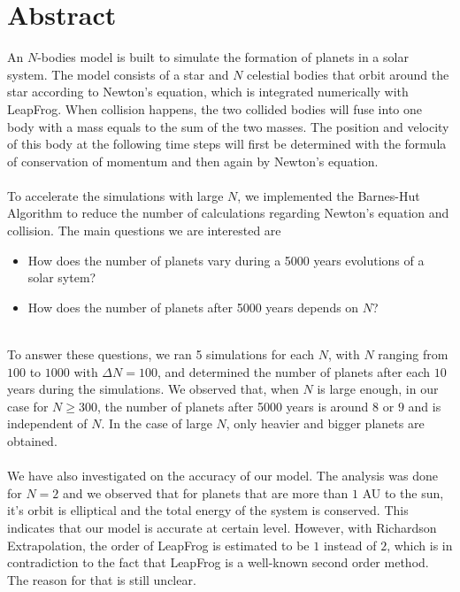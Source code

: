 \section{Abstract}
An $N$-bodies model is built to simulate the formation of planets in a solar system. The model consists of a star and $N$ celestial bodies that orbit around the star according to Newton's equation, which is integrated numerically with LeapFrog. When collision happens, the two collided bodies will fuse into one body with a mass equals to the sum of the two masses. The position and velocity of this body at the following time steps will first be determined with the formula of conservation of momentum and then again by Newton's equation.\\
\\
To accelerate the simulations with large $N$, we implemented the Barnes-Hut Algorithm to reduce the number of calculations regarding Newton's equation and collision. The main questions we are interested are
\begin{itemize}
\item How does the number of planets vary during a 5000 years evolutions of a solar sytem?

\item How does the number of planets after 5000 years depends on $N$?
\end{itemize}
\leavevmode
\\
To answer these questions, we ran 5 simulations for each $N$, with $N$ ranging from $100$ to $1000$ with $\Delta N=100$, and determined the number of planets after each $10$ years during the simulations. We observed that, when $N$ is large enough, in our case for $N\geq 300$, the number of planets after 5000 years is around $8$ or $9$ and is independent of $N$. In the case of large $N$, only heavier and bigger planets are obtained.\\
\\
We have also investigated on the accuracy of our model. The analysis was done for $N=2$ and we observed that for planets that are more than $1$ AU to the sun, it's orbit is elliptical and the total energy of the system is conserved. This indicates that our model is accurate at certain level. However, with Richardson Extrapolation, the order of LeapFrog is estimated to be $1$ instead of $2$, which is in contradiction to the fact that LeapFrog is a well-known second order method. The reason for that is still unclear.